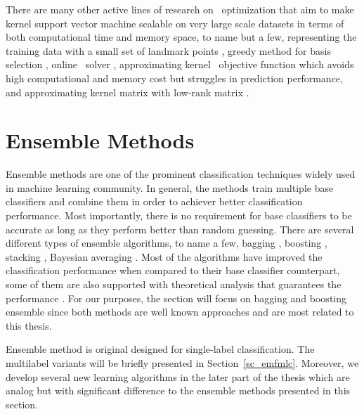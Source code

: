 {There are many other active lines of research on \svm\ optimization that aim to make kernel support vector machine scalable on very large scale datasets in terms of both computational time and memory space, to name but a few, representing the training data with a small set of landmark points \citep{Pavlov00towards,Boley04training,Yu05making,Zhang08improved}, greedy method for basis selection \citep{Keerthi06building}, online \svm\ solver \citep{Bordes05fast}, approximating kernel \svm\ objective function \citep{Zhang12scaling, Le13fast} which avoids high computational and memory cost but struggles in prediction performance, and approximating kernel matrix with low-rank matrix \citep{Smola00sparse,Fine02efficient,Drineas05on,Si14memory}.
\fi


%
%
%
\section{Ensemble Methods} \label{sc_em}

Ensemble methods are one of the prominent classification techniques widely used in machine learning community.
In general, the methods train multiple base classifiers and combine them in order to achiever better classification performance.
Most importantly, there is no requirement for base classifiers to be accurate as long as they perform better than random guessing.
There are several different types of ensemble algorithms, to name a few, bagging \citep{Breiman96bagging}, boosting \citep{Freund97a,Schapire99improved}, stacking \citep{Smyth99linearly}, Bayesian averaging \citep{Freund04generalization}.
Most of the algorithms have improved the classification performance when compared to their base classifier counterpart, some of them are also supported with theoretical analysis that guarantees the performance \citep{Schapire97boosting,Koltchinskii00empirical,Cortes14semble,Cortes14deep}.
For our purposes, the section will focus on bagging and boosting ensemble since both methods are well known approaches and are most related to this thesis.

Ensemble method is original designed for single-label classification.
The multilabel variants will be briefly presented in Section~\ref{sc_emfmlc}.
Moreover, we develop several new learning algorithms in the later part of the thesis which are analog but with significant difference to the ensemble methods presented in this section.



}

